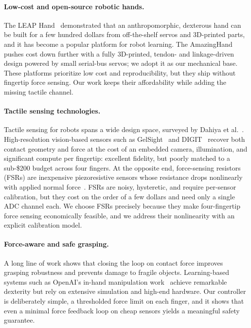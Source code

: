 \documentclass[acmlarge,screen,nonacm]{acmart}
\begin{document}
\paragraph{Low-cost and open-source robotic hands.}
The LEAP Hand~\cite{shaw2023leap} demonstrated that an anthropomorphic,
dexterous hand can be built for a few hundred dollars from off-the-shelf servos
and 3D-printed parts, and it has become a popular platform for robot learning.
The AmazingHand~\cite{pollen2025amazinghand} pushes cost down further with a
fully 3D-printed, tendon- and linkage-driven design powered by small serial-bus
servos; we adopt it as our mechanical base. These platforms prioritize low cost
and reproducibility, but they ship without fingertip force sensing. Our
work keeps their affordability while adding the missing tactile channel.

\paragraph{Tactile sensing technologies.}
Tactile sensing for robots spans a wide design space, surveyed by Dahiya et
al.~\cite{dahiya2010tactile}. High-resolution vision-based sensors such as
GelSight~\cite{yuan2017gelsight} and DIGIT~\cite{lambeta2020digit} recover both
contact geometry and force at the cost of an embedded camera, illumination, and
significant compute per fingertip: excellent fidelity, but poorly matched to a
sub-\$200 budget across four fingers. At the opposite end, force-sensing
resistors (FSRs) are inexpensive piezoresistive sensors whose resistance drops
nonlinearly with applied normal force~\cite{interlink2024fsr}. FSRs are noisy,
hysteretic, and require per-sensor calibration, but they cost on the order of a
few dollars and need only a single ADC channel each. We choose FSRs precisely
because they make four-fingertip force sensing economically feasible, and we
address their nonlinearity with an explicit calibration model.

\paragraph{Force-aware and safe grasping.}
A long line of work shows that closing the loop on contact force improves
grasping robustness and prevents damage to fragile objects. Learning-based
systems such as OpenAI's in-hand manipulation
work~\cite{andrychowicz2020dexterity} achieve remarkable dexterity but rely on
extensive simulation and high-end hardware. Our controller is deliberately
simple, a thresholded force limit on each finger, and it shows that even a
minimal force feedback loop on cheap sensors yields a meaningful safety
guarantee.
\end{document}
